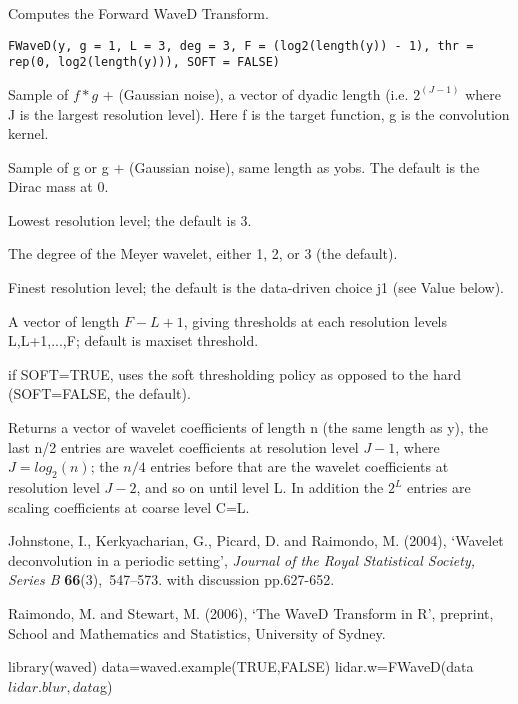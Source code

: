 \begin{Description}\relax
Computes the Forward WaveD Transform.
\end{Description}
\begin{Usage}
\begin{verbatim}
FWaveD(y, g = 1, L = 3, deg = 3, F = (log2(length(y)) - 1), thr = rep(0, log2(length(y))), SOFT = FALSE)
\end{verbatim}
\end{Usage}
\begin{Arguments}
\begin{ldescription}
\item[\code{y}] Sample of $f*g$ + (Gaussian noise), a vector of dyadic length 
(i.e. $2^(J-1)$ where J is the largest resolution level). 
Here f is the target function, g is the convolution kernel.
\item[\code{g}] Sample of g or g + (Gaussian noise), same length as yobs.
The default is the Dirac mass at 0.
\item[\code{L}] Lowest resolution level; the default is 3.
\item[\code{deg}] The degree of the Meyer wavelet, either 1, 2, or 3 (the default).
\item[\code{F}] Finest resolution level; the default is the data-driven choice j1
(see Value below).
\item[\code{thr}] A vector of length $F-L+1$, giving thresholds at each resolution levels L,L+1,...,F; default is maxiset threshold.
\item[\code{SOFT}] if SOFT=TRUE, uses the soft thresholding policy as opposed to the
hard (SOFT=FALSE, the default).
\end{ldescription}
\end{Arguments}
\begin{Value}
Returns a vector of wavelet coefficients of length n (the same length as y),
the last n/2 entries are wavelet coefficients at resolution level $J-1$, where
$J = log_2(n)$; the $n/4$ entries before that are the wavelet coefficients at
resolution level $J-2$, and so on until level L. In addition the $2^L$ entries
are scaling coefficients at coarse level C=L.
\end{Value}
\begin{References}\relax
Johnstone, I., Kerkyacharian, G., Picard, D. and Raimondo, M.  (2004), 
`Wavelet deconvolution in a periodic
setting', {\em Journal of the Royal Statistical Society, Series B} {\bf
66}(3),~547--573.  with discussion pp.627-652.

Raimondo, M. and Stewart, M. (2006),
`The WaveD Transform in R', preprint, School and Mathematics and Statistics,
University of Sydney.
\end{References}
\begin{SeeAlso}\relax
{}
\end{SeeAlso}
\begin{Examples}
\begin{ExampleCode}
library(waved)
data=waved.example(TRUE,FALSE)
lidar.w=FWaveD(data$lidar.blur,data$g)
\end{ExampleCode}
\end{Examples}

